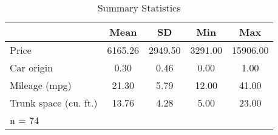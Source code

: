 \begin{table}[htbp]\centering
\def\sym#1{\ifmmode^{#1}\else\(^{#1}\)\fi}
\caption{\centering Summary Statistics}
\begin{tabular}{l*{1}{cccc}}
\hline\hline
                &     Mean&       SD&      Min&      Max\\
\hline
Price           &  6165.26&  2949.50&  3291.00& 15906.00\\
Car origin      &     0.30&     0.46&     0.00&     1.00\\
Mileage (mpg)   &    21.30&     5.79&    12.00&    41.00\\
Trunk space (cu. ft.)&    13.76&     4.28&     5.00&    23.00\\
\hline\hline
\multicolumn{5}{l}{\footnotesize n = 74}\\
\end{tabular}
\end{table}
